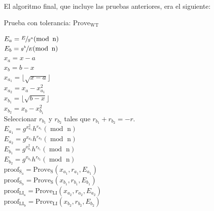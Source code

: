 El algoritmo final, que incluye las pruebas anteriores, era el siguiente: \\
\begin{minipage}{0.9\textwidth}
    \begin{algorithm}[H]
        \caption{Prueba con tolerancia: $\operatorname{Prove_{WT}}$}

        $E_{a} = \sfrac{E}{g^{a}} (\operatorname{mod} \text{ n})$ \\
        $E_{b} = \sfrac{g^{b}}{E} (\operatorname{mod} \text{ n})$ \\
        $x_{a} = x - a$ \\
        $x_{b} = b - x$ \\
        $x_{a_{1}} = \lfloor \sqrt{x - a} \rfloor$ \\
        $x_{a_{2}} = x_{a} - x_{a_{1}}^{2}$ \\
        $x_{b_{1}} = \lfloor \sqrt{b - x} \rfloor$ \\
        $x_{b_{2}} = x_{b} - x_{b_{1}}^{2}$ \\
        Seleccionar $r_{b_{1}}$ y $r_{b_{2}}$ tales que $r_{b_{1}} + r_{b_{2}} = -r$. \\
        $E_{a_{1}} = g^{x^{2}_{a_{1}}}h^{r_{a_{1}}} (\operatorname{mod} \text{ n})$ \\
        $E_{a_{2}} = g^{x_{a_{2}}}h^{r_{a_{2}}} (\operatorname{mod} \text{ n})$ \\
        $E_{b_{1}} = g^{x^{2}_{b_{1}}}h^{r_{b_{1}}} (\operatorname{mod} \text{ n})$ \\
        $E_{b_{2}} = g^{x_{b_{2}}}h^{r_{b_{2}}} (\operatorname{mod} \text{ n})$ \\
        $\operatorname{proof_{S_{a}}} = \operatorname{Prove_{S}}(x_{a_{1}}, r_{a_{1}}, E_{a_{1}})$ \\
        $\operatorname{proof_{S_{b}}} = \operatorname{Prove_{S}}(x_{b_{1}}, r_{b_{1}}, E_{b_{1}})$ \\
        $\operatorname{proof_{LI_{a}}} = \operatorname{Prove_{LI}}(x_{a_{2}}, r_{a_{2}}, E_{a_{2}})$ \\
        $\operatorname{proof_{LI_{b}}} = \operatorname{Prove_{LI}}(x_{b_{2}}, r_{b_{2}}, E_{b_{2}})$ \\

    \end{algorithm}
\end{minipage} \\
